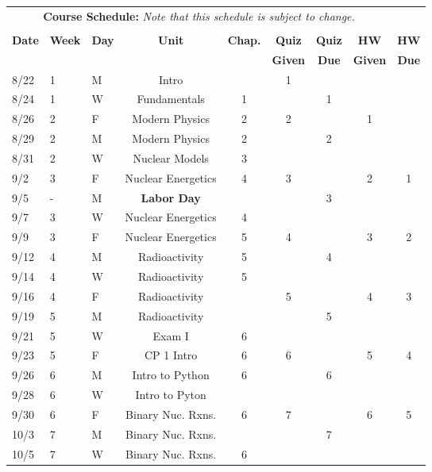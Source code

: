 \documentclass[11pt, a4paper]{article}
\begin{document}
\pagebreak
\FloatBarrier
\renewcommand{\arraystretch}{1}
\begin{table}[h]
\begin{center}
\begin{tabular}{lllcccccc}
\multicolumn{8}{c}{\textbf{Course Schedule:}\textit{ Note that this schedule is
subject to change.}}\\
&&&&&&&&\\
\textbf{Date} & \textbf{Week} & \textbf{Day} & \textbf{Unit} & \textbf{Chap.} & \textbf{Quiz}& \textbf{Quiz} & \textbf{HW} & \textbf{HW}\\
              &  &  &  &  & \textbf{Given} & \textbf{Due} & \textbf{Given} & \textbf{Due}\\ \hline
\hline
8/22 & 1 & M & Intro              &  & 1 &  &  & \\
8/24 & 1 & W & Fundamentals       & 1 &  & 1 & &  \\
8/26 & 2 & F & Modern Physics     & 2 & 2  &  & 1 &  \\
8/29 & 2 & M & Modern Physics     & 2 &   & 2 &  &  \\
8/31 & 2 & W & Nuclear Models     & 3 &  &  &  &   \\
9/2 & 3 & F & Nuclear Energetics & 4 & 3  &  & 2 & 1 \\
9/5 & - & M & \textbf{Labor Day}  &  & & 3 & &  \\
9/7 & 3 & W & Nuclear Energetics  & 4 &   &  &  &  \\
9/9 & 3 & F & Nuclear Energetics       & 5 & 4 &  & 3 & 2 \\
9/12 & 4 & M & Radioactivity       & 5 &   & 4 &  &  \\
9/14 & 4 & W & Radioactivity       & 5 &   &  &  &  \\
9/16 & 4 & F & Radioactivity             &   & 5 &  & 4 & 3 \\
9/19 & 5 & M & Radioactivity             &   &   & 5  &  &  \\
9/21 & 5 & W & Exam I              & 6 &   &  &  &  \\
9/23 & 5 & F & CP 1 Intro          & 6 & 6 &  & 5 & 4 \\
9/26 & 6 & M & Intro to Python  & 6 &   & 6 &  &  \\
9/28 & 6 & W & Intro to Pyton      &  &  &  &  &  \\
9/30 & 6 & F & Binary Nuc. Rxns.  & 6 & 7 &  & 6 & 5  \\
10/3 & 7 & M & Binary Nuc. Rxns. &  &  & 7 &  &  \\
10/5 & 7 & W & Binary Nuc. Rxns.  & 6 &  &  &  &  \\

\end{tabular}
\end{center}
\end{table}
\end{document}
